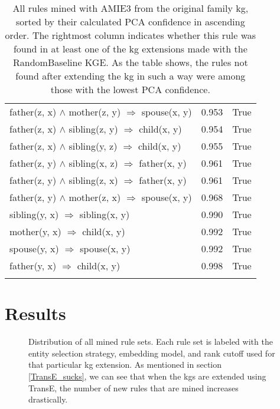 \begin{longtable}{lrl}
      father(z, x) $\wedge$ mother(z, y)   $\Rightarrow$ spouse(x, y) &           0.953 &                     True \\
      father(z, x) $\wedge$ sibling(z, y)   $\Rightarrow$ child(x, y) &           0.954 &                     True \\
      father(z, x) $\wedge$ sibling(y, z)   $\Rightarrow$ child(x, y) &           0.955 &                     True \\
     father(z, y) $\wedge$ sibling(x, z)   $\Rightarrow$ father(x, y) &           0.961 &                     True \\
     father(z, y) $\wedge$ sibling(z, x)   $\Rightarrow$ father(x, y) &           0.961 &                     True \\
      father(z, y) $\wedge$ mother(z, x)   $\Rightarrow$ spouse(x, y) &           0.968 &                     True \\
                    sibling(y, x)   $\Rightarrow$ sibling(x, y) &           0.990 &                     True \\
                       mother(y, x)   $\Rightarrow$ child(x, y) &           0.992 &                     True \\
                      spouse(y, x)   $\Rightarrow$ spouse(x, y) &           0.992 &                     True \\
                       father(y, x)   $\Rightarrow$ child(x, y) &           0.998 &                     True \\
\bottomrule
\caption[Original rules listed family KG]{All rules mined with AMIE3 from the original family \gls{kg}, sorted by their calculated PCA confidence in ascending order. The rightmost column indicates whether this rule was found in at least one of the \gls{kg} extensions made with the RandomBaseline KGE. As the table shows, the rules not found after extending the \gls{kg} in such a way were among those with the lowest PCA confidence.}
\label{original_rules_found_by_baseline_family}
\end{longtable}


\chapter{Results}

\begin{figure}[htbp]
\centering
    \centering
    
    \caption[Dist. of all sets of mined rules.]{Distribution of all mined rule sets. Each rule set is labeled with the entity selection strategy, embedding model, and rank cutoff used for that particular \gls{kg} extension. As mentioned in section \ref{TransE_sucks}, we can see that when the \glspl{kg} are extended using TransE, the number of new rules that are mined increases drastically.}
    \label{all_sets}
\end{figure}


